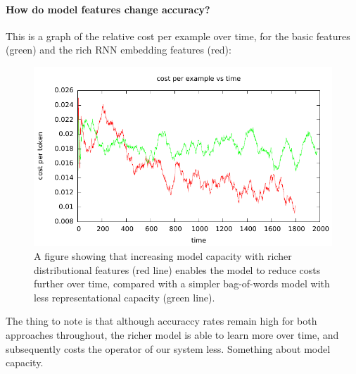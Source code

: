 \paragraph{How do model features change accuracy?}

This is a graph of the relative cost per example over time, for the basic features (green) and the rich RNN embedding features (red):

\begin{figure}[t]
  \begin{centering}
  \includegraphics[width=1.0\textwidth]{figures/sentiment_cost_per_token_vs_time/cost_per_token_vs_time.pdf}
  \end{centering}
  \caption{A figure showing that increasing model capacity with richer distributional features (red line) enables the model to reduce costs further over time, compared with a simpler bag-of-words model with less representational capacity (green line).}
\label{fig:crf}
\end{figure}

The thing to note is that although accuraccy rates remain high for both approaches throughout, the richer model is able to learn more over time, and subsequently costs the operator of our system less.
Something about model capacity.

